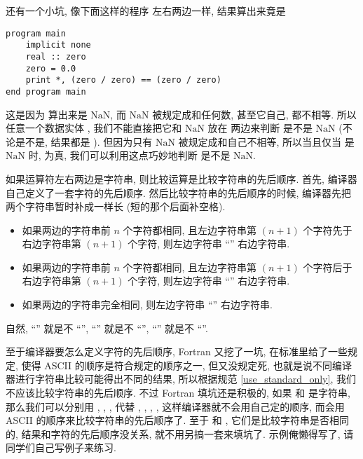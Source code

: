 还有一个小坑, 像下面这样的程序 \ttt{==} 左右两边一样, 结果算出来竟是 
\begin{lstlisting}
program main
    implicit none
    real :: zero
    zero = 0.0
    print *, (zero / zero) == (zero / zero)
end program main
\end{lstlisting}
这是因为  算出来是 $\text{NaN}$, 而 $\text{NaN}$ 被规定成和任何数, 甚至它自己, 都不相等. 所以任意一个数据实体 \ttt{[r]}, 我们不能直接把它和 $\text{NaN}$ 放在 \ttt{==} 两边来判断 \ttt{[r]} 是不是 $\text{NaN}$ (不论是不是, 结果都是 ). 但因为只有 $\text{NaN}$ 被规定成和自己不相等, 所以当且仅当 \ttt{[r]} 是 $\text{NaN}$ 时, \ttt{[r] != [r]} 为真, 我们可以利用这点巧妙地判断 \ttt{[r]} 是不是 $\text{NaN}$.

如果运算符左右两边是字符串, 则比较运算是比较字符串的先后顺序. 首先, 编译器自己定义了一套字符的先后顺序. 然后比较字符串的先后顺序的时候, 编译器先把两个字符串暂时补成一样长 (短的那个后面补空格).
\begin{itemize}
    \item 如果两边的字符串前 $n$ 个字符都相同, 且左边字符串第 $(n+1)$ 个字符先于右边字符串第 $(n+1)$ 个字符, 则左边字符串 ``\ttt{<}'' 右边字符串.
    \item 如果两边的字符串前 $n$ 个字符都相同, 且左边字符串第 $(n+1)$ 个字符后于右边字符串第 $(n+1)$ 个字符, 则左边字符串 ``\ttt{>}'' 右边字符串.
    \item 如果两边的字符串完全相同, 则左边字符串 ``\ttt{==}'' 右边字符串.
\end{itemize}
自然, ``\ttt{>=}'' 就是不 ``\ttt{<}'', ``\ttt{<=}'' 就是不 ``\ttt{>}'', ``\ttt{/=}'' 就是不 ``\ttt{==}''.

至于编译器要怎么定义字符的先后顺序, Fortran 又挖了一坑, 在标准里给了一些规定, 使得 ASCII 的顺序是符合规定的顺序之一, 但又没规定死, 也就是说不同编译器进行字符串比较可能得出不同的结果, 所以根据规范 \ref{use_standard_only}, 我们不应该比较字符串的先后顺序. 不过 Fortran 填坑还是积极的, 如果 \ttt{[a]} 和 \ttt{[b]} 是字符串, 那么我们可以分别用 , , ,  代替 \ttt{[a] >= [b]}, \ttt{[a] > [b]}, \ttt{[a] <= [b]}, \ttt{[a] < [b]}, 这样编译器就不会用自己定的顺序, 而会用 ASCII 的顺序来比较字符串的先后顺序了. 至于 \ttt{[a] == [b]} 和 \ttt{[a] != [b]}, 它们是比较字符串是否相同的, 结果和字符的先后顺序没关系, 就不用另搞一套来填坑了. 示例俺懒得写了, 请同学们自己写例子来练习.
